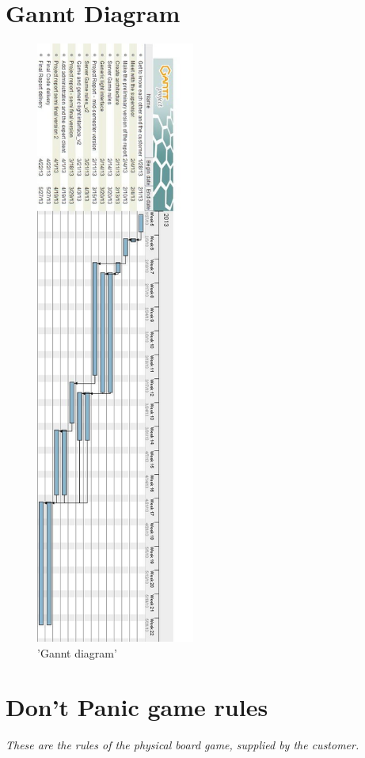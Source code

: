 

\appendix
\renewcommand{\thesection}{\arabic{section}}

\chapter{Gannt Diagram}

\begin{figure}[H]
  \centering
    \includegraphics[height=20cm]{img/ganttv3v2.jpg}
  \caption{ 'Gannt diagram'} 
  \label{fig:paperPrototype}
\end{figure}






\chapter{Don't Panic game rules}
%
\emph{These are the rules of the physical board game, supplied by the customer.}
%
%
